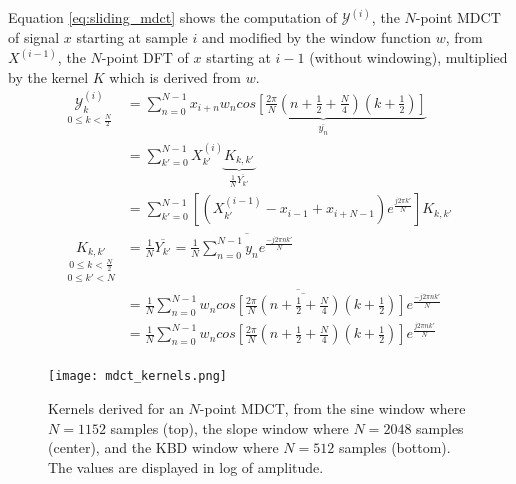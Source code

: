 \documentclass[journal]{IEEEtran}
\begin{document}
Equation \ref{eq:sliding_mdct} shows the computation of $\mathcal{Y}^{(i)}$, the $N$-point MDCT of signal $x$ starting at sample $i$ and modified by the window function $w$, from $X^{(i-1)}$, the $N$-point DFT of $x$ starting at $i-1$ (without windowing), multiplied by the kernel $K$ which is derived from $w$.
\begin{equation}
\label{eq:sliding_mdct}
\begin{split}
\underset{0 \leq k < \frac{N}{2}}{\mathcal{Y}_k^{(i)}} 
& = \sum_{n=0}^{N-1} x_{i+n} \underbrace{w_n cos \left[\frac{2\pi}{N} \left(n+\frac{1}{2}+\frac{N}{4}\right)\left(k+\frac{1}{2}\right)\right]}_{\overline{y_n}} \\
& = \sum_{k'=0}^{N-1} X_{k'}^{(i)} \underbrace{K_{k,k'}}_{\frac{1}{N} \overline{Y_{k'}}} \\
& = \sum_{k'=0}^{N-1} \left[\left(X_{k'}^{(i-1)} - x_{i-1} + x_{i+N-1} \right) e^{\frac{j 2\pi k'}{N}}\right] K_{k,k'} \\
\underset{0 \leq k' < N}{\underset{0 \leq k < \frac{N}{2}}{K_{k,k'}}} 
& = \frac{1}{N} \overline{Y_{k'}} = \frac{1}{N} \overline{\sum_{n=0}^{N-1} y_n  e^{\frac{-j 2\pi n k'}{N}}} \\
& = \frac{1}{N} \overline{\sum_{n=0}^{N-1} \overline{w_n cos  \left[\!\frac{2\pi}{N}\!\left(\!n\!+\frac{1}{2}\!+\!\frac{N}{4}\!\right)\!\left(\!k\!+\!\frac{1}{2}\!\right)\!\right]} e^{\frac{-j 2\pi n k'}{N}}} \\
& = \frac{1}{N} \sum_{n=0}^{N-1} w_n cos  \left[\!\frac{2\pi}{N}\!\left(\!n\!+\frac{1}{2}\!+\!\frac{N}{4}\!\right)\!\left(\!k\!+\!\frac{1}{2}\!\right)\!\right]  e^{\frac{j 2\pi n k'}{N}} \\
\end{split}
\end{equation}

\begin{figure}[htbp]
	\centering
	\texttt{[image: mdct\_kernels.png]}
	\caption{Kernels derived for an $N$-point MDCT, from the sine window where $N = 1152$ samples (top), the slope window where $N = 2048$ samples (center), and the KBD window where $N = 512$ samples (bottom). The values are displayed in log of amplitude.}
	\label{fig:mdct_kernels}
\end{figure}
\end{document}

